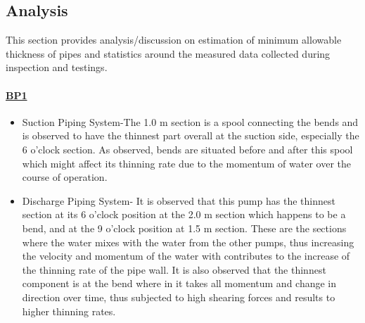 
\subsection{Analysis} 
This section provides analysis/discussion on estimation of minimum allowable thickness of pipes and statistics around the measured data collected during inspection and testings.



\paragraph{\underline{BP1}}
\begin{itemize}
\item Suction Piping System-The 1.0 m section is a spool connecting the bends and is observed to have the thinnest part overall at the suction side, especially the 6 o’clock section. As observed, bends are situated before and after this spool which might affect its thinning rate due to the momentum of water over the course of operation.

\item Discharge Piping System- It is observed that this pump has the thinnest section at its 6 o'clock position at the 2.0 m section which happens to be a bend, and at the 9 o’clock position at 1.5 m section. These are the sections where the water mixes with the water from the other pumps, thus increasing the velocity and momentum of the water with contributes to the increase of the thinning rate of the pipe wall. It is also observed that the thinnest component is at the bend where in it takes all momentum and change in direction over time, thus subjected to high shearing forces and results to higher thinning rates.

\end{itemize}

